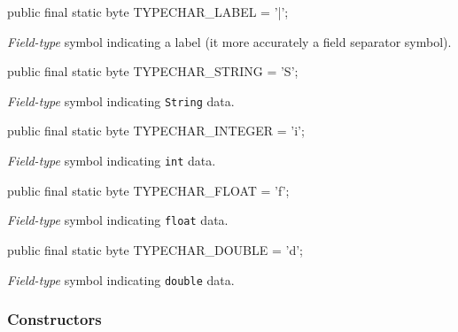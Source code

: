 \begin{code}
   public final static byte TYPECHAR_LABEL   = '|';
\end{code}
\begin{tabb}
\emph{Field-type} symbol indicating a label (it more accurately a field separator symbol).
\end{tabb}
\begin{code}

   public final static byte TYPECHAR_STRING  = 'S';
\end{code}
\begin{tabb}
\emph{Field-type} symbol indicating \texttt{String} data.
\end{tabb}
\begin{code}

   public final static byte TYPECHAR_INTEGER = 'i';
\end{code}
\begin{tabb}
\emph{Field-type} symbol indicating \texttt{int} data.
\end{tabb}
\begin{code}

   public final static byte TYPECHAR_FLOAT   = 'f';
\end{code}
\begin{tabb}
\emph{Field-type} symbol indicating \texttt{float} data.
\end{tabb}
\begin{code}

   public final static byte TYPECHAR_DOUBLE  = 'd';
\end{code}
\begin{tabb}
\emph{Field-type} symbol indicating \texttt{double} data.
\end{tabb}


\subsubsection*{Constructors}

